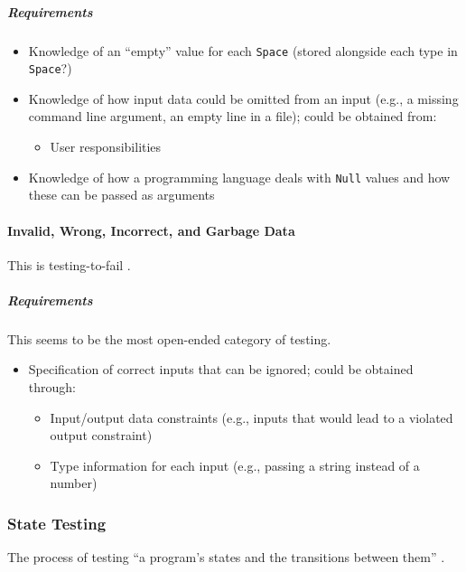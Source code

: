 \subparagraph{Requirements}
\begin{itemize}
      \item Knowledge of an ``empty'' value for each \texttt{Space} (stored
            alongside each type in \texttt{Space}?)
      \item Knowledge of how input data could be omitted from an input
            (e.g., a missing command line argument, an empty line in a file);
            could be obtained from:
            \begin{itemize}
                  \item User responsibilities
            \end{itemize}
      \item Knowledge of how a programming language deals with \texttt{Null}
            values and how these can be passed as arguments
\end{itemize}

\paragraph{Invalid, Wrong, Incorrect, and Garbage Data
      \cite[p.~78-79]{patton_software_2006}}

This is testing-to-fail \cite[p.~77]{patton_software_2006}.

\subparagraph{Requirements}
This seems to be the most open-ended category of testing.
\begin{itemize}
      \item Specification of correct inputs that can be ignored;
            could be obtained through:
            \begin{itemize}
                  \item Input/output data constraints (e.g., inputs that would
                        lead to a violated output constraint)
                  \item Type information for each input (e.g., passing a string
                        instead of a number)
            \end{itemize}
\end{itemize}

\subsubsection{State Testing \cite[p.~79-87]{patton_software_2006}}

The process of testing ``a program's states and the transitions between them''
\cite[p.~79]{patton_software_2006}.

